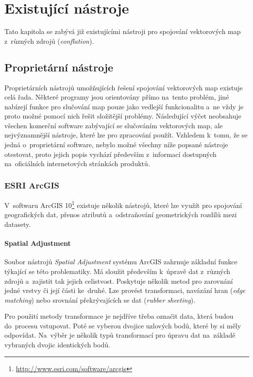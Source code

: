 \chapter{Existující nástroje}
\label{3-nastroje}

Tato kapitola se zabývá již existujícími nástroji pro spojování vektorových map
 z~různých zdrojů (\textit{conflation}).


\section{Proprietární nástroje}
\label{proprietární}

Proprietárních nástrojů umožňujících řešení spojování vektorových map 
existuje celá řada. Některé programy jsou orientovány přímo na~tento problém,
jiné nabízejí funkce pro slučování map pouze jako vedlejší funkcionalitu 
a~ne vždy je proto možné pomocí nich řešit složitější problémy. Následující
výčet neobsahuje všechen komerční software zabývající se slučováním
vektorových map, ale nejvýznamnější nástroje, které lze pro zpracování 
použít. Vzhledem k~tomu, že se jedná o~proprietární software, nebylo možné 
všechny níže popsané nástroje otestovat, proto jejich popis vychází 
především z~informací dostupných na~oficiálních internetových stránkách 
produktů.


\subsection{ESRI ArcGIS}
\label{arcgis}

V~softwaru ArcGIS 10\footnote{\url{http://www.esri.com/software/arcgis}} 
existuje několik nástrojů, které lze využít pro spojování
geo\-grafických dat, přenos atributů a~odstraňování geometrických rozdílů 
mezi datasety. 

\subsubsection{Spatial Adjustment}

Soubor nástrojů \textit{Spatial Adjustment} systému ArcGIS zahrnuje 
základní funkce týkající se této problematiky. Má sloužit především 
k~úpravě dat z~různých zdrojů a~zajistit tak jejich celistvost. 
Poskytuje několik metod pro zarovnání jedné vrstvy či její části 
ke~druhé. Lze provést transformaci, navázání hran (\textit{edge matching})
nebo srovnání překrývajících se dat (\textit{rubber sheeting}).

Pro použití metody transformace je nejdříve třeba označit data, která budou
do~procesu vstupovat. Poté se vyberou dvojice uzlových bodů, které by si měly
odpovídat. Na~výběr je několik typů transformací pro úpravu dat
na~zá\-kladě vybraných dvojic identických bodů. 

